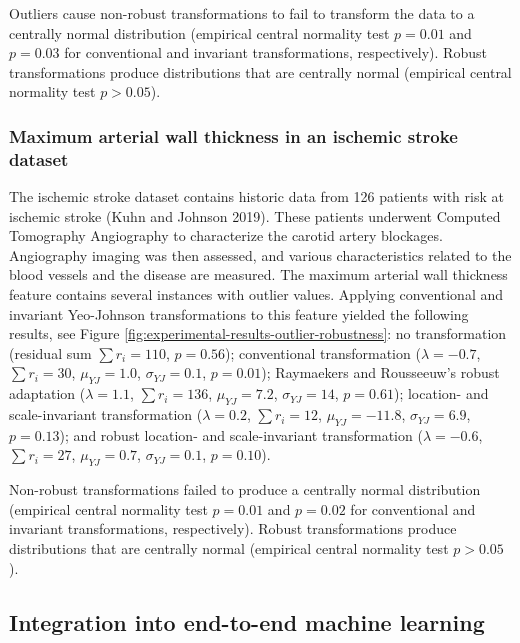 \documentclass[preprint,12pt,authoryear]{elsarticle}
\begin{document}
Outliers cause non-robust transformations to fail to transform the data
to a centrally normal distribution (empirical central normality test
\(p = 0.01\) and \(p=0.03\) for conventional and invariant
transformations, respectively). Robust transformations produce
distributions that are centrally normal (empirical central normality
test \(p > 0.05\)).

\subsubsection{Maximum arterial wall thickness in an ischemic stroke
dataset}\label{maximum-arterial-wall-thickness-in-an-ischemic-stroke-dataset}

The ischemic stroke dataset contains historic data from 126 patients
with risk at ischemic stroke (Kuhn and Johnson 2019). These patients
underwent Computed Tomography Angiography to characterize the carotid
artery blockages. Angiography imaging was then assessed, and various
characteristics related to the blood vessels and the disease are
measured. The maximum arterial wall thickness feature contains several
instances with outlier values. Applying conventional and invariant
Yeo-Johnson transformations to this feature yielded the following
results, see Figure \ref{fig:experimental-results-outlier-robustness}:
no transformation (residual sum \(\sum r_i = 110\), \(p=0.56\));
conventional transformation (\(\lambda = -0.7\), \(\sum r_i = 30\),
\(\mu_{YJ} = 1.0\), \(\sigma_{YJ} = 0.1\), \(p=0.01\)); Raymaekers and
Rousseeuw's robust adaptation (\(\lambda = 1.1\), \(\sum r_i = 136\),
\(\mu_{YJ} = 7.2\), \(\sigma_{YJ} = 14\), \(p=0.61\)); location- and
scale-invariant transformation (\(\lambda = 0.2\), \(\sum r_i = 12\),
\(\mu_{YJ} = -11.8\), \(\sigma_{YJ} = 6.9\), \(p=0.13\)); and robust
location- and scale-invariant transformation (\(\lambda = -0.6\),
\(\sum r_i = 27\), \(\mu_{YJ} = 0.7\), \(\sigma_{YJ} = 0.1\),
\(p=0.10\)).

Non-robust transformations failed to produce a centrally normal
distribution (empirical central normality test \(p=0.01\) and \(p=0.02\)
for conventional and invariant transformations, respectively). Robust
transformations produce distributions that are centrally normal
(empirical central normality test \(p > 0.05\)).

\subsection{Integration into end-to-end machine
learning}\label{integration-into-end-to-end-machine-learning}
\end{document}
